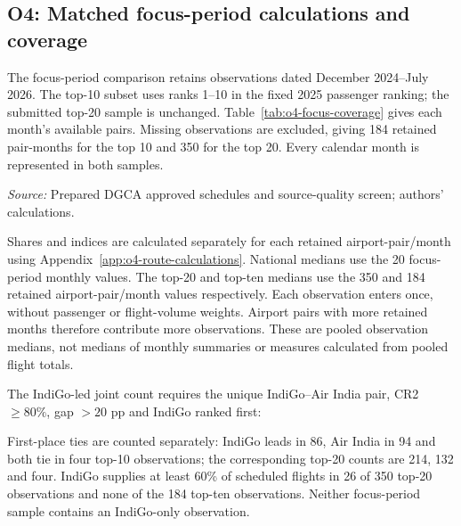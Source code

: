\documentclass[12pt,a4paper]{article}
\begin{document}
\clearpage
\subsection{O4: Matched focus-period calculations and coverage}
\label{app:o4-route-focus}
The focus-period comparison retains observations dated December 2024--July 2026. The top-10 subset uses ranks 1--10 in the fixed 2025 passenger ranking; the submitted top-20 sample is unchanged. Table~\ref{tab:o4-focus-coverage} gives each month's available pairs. Missing observations are excluded, giving 184 retained pair-months for the top 10 and 350 for the top 20. Every calendar month is represented in both samples.

\begin{minipage}{\linewidth}
\captionsetup{font=small,labelfont=bf,justification=raggedright,singlelinecheck=false,hypcap=false}
\label{tab:o4-focus-coverage}
\centering
{\small{}\par}
\vspace{4pt}
{\footnotesize{}\raggedright\textit{Source:} Prepared DGCA approved schedules and source-quality screen; authors' calculations.\par}
\end{minipage}

Shares and indices are calculated separately for each retained airport-pair/month using Appendix~\ref{app:o4-route-calculations}. National medians use the 20 focus-period monthly values. The top-20 and top-ten medians use the 350 and 184 retained airport-pair/month values respectively. Each observation enters once, without passenger or flight-volume weights. Airport pairs with more retained months therefore contribute more observations. These are pooled observation medians, not medians of monthly summaries or measures calculated from pooled flight totals.

\begin{samepage}
The IndiGo-led joint count requires the unique IndiGo--Air India pair, CR2 $\geq80\%$, gap $>20$ pp and IndiGo ranked first:

\end{samepage}
First-place ties are counted separately: IndiGo leads in 86, Air India in 94 and both tie in four top-10 observations; the corresponding top-20 counts are 214, 132 and four. IndiGo supplies at least 60\% of scheduled flights in 26 of 350 top-20 observations and none of the 184 top-ten observations. Neither focus-period sample contains an IndiGo-only observation.
\end{document}
